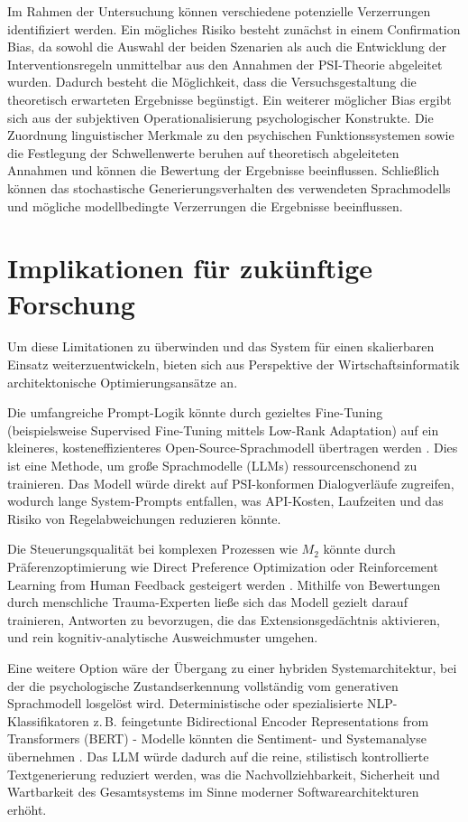 Im Rahmen der Untersuchung können verschiedene potenzielle Verzerrungen identifiziert werden. Ein mögliches Risiko besteht zunächst in einem Confirmation Bias, da sowohl die Auswahl der beiden Szenarien als auch die Entwicklung der Interventionsregeln unmittelbar aus den Annahmen der PSI-Theorie abgeleitet wurden. Dadurch besteht die Möglichkeit, dass die Versuchsgestaltung die theoretisch erwarteten Ergebnisse begünstigt. Ein weiterer möglicher Bias ergibt sich aus der subjektiven Operationalisierung psychologischer Konstrukte. Die Zuordnung linguistischer Merkmale zu den psychischen Funktionssystemen sowie die Festlegung der Schwellenwerte beruhen auf theoretisch abgeleiteten Annahmen und können die Bewertung der Ergebnisse beeinflussen. Schließlich können das stochastische Generierungsverhalten des verwendeten Sprachmodells und mögliche modellbedingte Verzerrungen die Ergebnisse beeinflussen. 

\section{Implikationen für zukünftige Forschung}
Um diese Limitationen zu überwinden und das System für einen skalierbaren 
Einsatz weiterzuentwickeln, bieten sich aus Perspektive der 
Wirtschaftsinformatik architektonische Optimierungsansätze an.

Die umfangreiche Prompt-Logik könnte durch gezieltes 
Fine-Tuning (beispielsweise Supervised Fine-Tuning mittels Low-Rank Adaptation) auf ein kleineres, 
kosteneffizienteres Open-Source-Sprachmodell
übertragen werden \citep{hu2021lora}. Dies ist eine Methode, um große Sprachmodelle (LLMs) ressourcenschonend zu trainieren. Das Modell würde direkt auf PSI-konformen Dialogverläufe 
zugreifen, wodurch lange System-Prompts entfallen, was 
API-Kosten, Laufzeiten und das Risiko von Regelabweichungen reduzieren könnte. 

Die Steuerungsqualität bei komplexen Prozessen wie $M_2$ könnte durch 
Präferenzoptimierung wie Direct Preference Optimization oder 
Reinforcement Learning from Human Feedback gesteigert werden \citep{rafailov2023direct,sharma2024towards}. Mithilfe 
von Bewertungen durch menschliche Trauma-Experten ließe sich das Modell gezielt darauf trainieren, 
Antworten zu bevorzugen, die das Extensionsgedächtnis aktivieren, und rein kognitiv-analytische 
Ausweichmuster umgehen.

Eine weitere Option wäre der Übergang zu einer hybriden Systemarchitektur, 
bei der die psychologische Zustandserkennung vollständig vom generativen Sprachmodell 
losgelöst wird. Deterministische oder spezialisierte NLP-Klassifikatoren z.\,B. 
feingetunte Bidirectional Encoder Representations from Transformers (BERT) - Modelle könnten die Sentiment- und Systemanalyse übernehmen \citep{alaparthi2021bert}. Das LLM würde 
dadurch auf die reine, stilistisch kontrollierte Textgenerierung reduziert werden, was die 
Nachvollziehbarkeit, Sicherheit und Wartbarkeit des Gesamtsystems im Sinne moderner 
Softwarearchitekturen erhöht.

